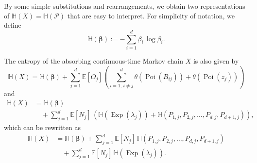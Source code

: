 \documentclass[smallextended]{svjour3}
\renewcommand{\vec}[1]{\mathbf{#1}}
\newcommand{\E}{\mathbb{E}}
\renewcommand{\H}{\mathbb{H}}
\newcommand{\Exp}{\operatorname{Exp}}
\newcommand{\Poi}{\operatorname{Poi}}
\newcommand{\suml}{\sum\limits}
\begin{document}
By some simple substitutions and rearrangements, we obtain two representations of $\H(X)=\H(\mathcal{P})$ that are easy to interpret.
For simplicity of notation, we define
\begin{equation}
  \H(\vec{\beta}) := -\suml_{i=1}^d\beta_i\,\log\beta_i.
\end{equation}

\begin{myproposition}\label{prop:entropy_of_X}
	The entropy of the absorbing continuous-time Markov chain $X$ is also given by
	\begin{equation}
	  \label{eqn:H_occupation_time}
	  \H(X) = \H(\vec{\beta}) + \suml_{j=1}^d \E\left[O_j\right] \left(\suml_{i=1,\,i\neq j}^d \theta(\Poi(B_{ij})) + \theta(\Poi(z_j))\right)
	\end{equation}
	and
	\begin{equation}
	  \label{eqn:H_number_of_visits}
	  \begin{aligned}
      \H(X)& = \H(\vec{\beta})\\
      &\quad + \suml_{j=1}^d \E\left[N_j\right]\, \left(\H(\Exp(\lambda_j)) + \H(P_{1,j}, P_{2, j},\ldots,P_{d, j}, P_{d+1,j})\right),
    \end{aligned}
  \end{equation}
  which can be rewritten as
  \begin{align}
    \H(X) & = \H(\vec{\beta}) + \suml_{j=1}^d \E\left[N_j\right]\, \H(P_{1,j}, P_{2, j},\ldots,P_{d, j}, P_{d+1,j}) \label{eqn:H_discrete} \\
    &\quad + \suml_{j=1}^d \E\left[N_j\right]\, \H(\Exp(\lambda_j)).\label{eqn:H_continuous}      
  \end{align}
\end{myproposition}
\end{document}
